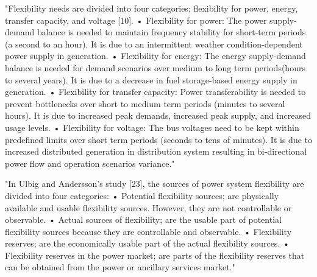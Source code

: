 



"Flexibility needs are divided into four categories; flexibility for power, energy, transfer capacity, and voltage [10]. • Flexibility for power: The power supply-demand balance is needed to maintain frequency stability for short-term periods (a second to an hour). It is due to an intermittent weather condition-dependent power supply in generation. • Flexibility for energy: The energy supply-demand balance is needed for demand scenarios over medium to long term periods(hours to several years). It is due to a decrease in fuel storage-based energy supply in generation. • Flexibility for transfer capacity: Power transferability is needed to prevent bottlenecks over short to medium term periods (minutes to several hours). It is due to increased peak demands, increased peak supply, and increased usage levels. • Flexibility for voltage: The bus voltages need to be kept within predefined limits over short term periods (seconds to tens of minutes). It is due to increased distributed generation in distribution system resulting in bi-directional power flow and operation scenarios variance." \cite{impram_challenges_2020}


"In Ulbig and Andersson’s study [23], the sources of power system flexibility are divided into four categories: • Potential flexibility sources; are physically available and usable flexibility sources. However, they are not controllable or observable. • Actual sources of flexibility; are the usable part of potential flexibility sources because they are controllable and observable. • Flexibility reserves; are the economically usable part of the actual flexibility sources. • Flexibility reserves in the power market; are parts of the flexibility reserves that can be obtained from the power or ancillary services market." \cite{impram_challenges_2020}

